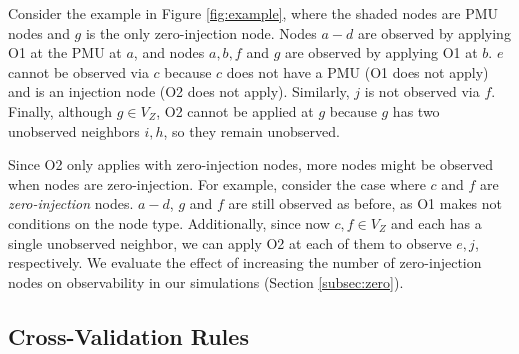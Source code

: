 Consider the example in Figure \ref{fig:example}, where the shaded nodes are PMU nodes and $g$ is the only zero-injection node. 
Nodes $a-d$ are observed by applying O1 at the PMU at $a$, and nodes $a,b,f$ and $g$ are observed by applying O1 at $b$. 
$e$ cannot be observed via $c$ because $c$ does not have a PMU (O1 does not apply) and is an injection node (O2 does not apply). %
Similarly, $j$ is not observed via $f$. Finally, although $g \in V_Z$, O2 cannot be applied at $g$ because $g$ has two unobserved neighbors $i,h$, so they remain unobserved.

Since O2 only applies with zero-injection nodes, more nodes might be observed when nodes are zero-injection. For example, consider the case where $c$ and $f$ are {\em zero-injection} nodes. $a-d$, $g$ and $f$ are still observed as before, as O1 makes not conditions on the node type. Additionally, 
since now $c,f \in V_Z$ and each has a single unobserved neighbor,  we can apply O2 at each of them to observe $e,j$, respectively. %
We evaluate the effect of increasing the number of zero-injection nodes on observability in our simulations (Section \ref{subsec:zero}).






\subsection{Cross-Validation Rules}
\label{subsec:xval-rules}

